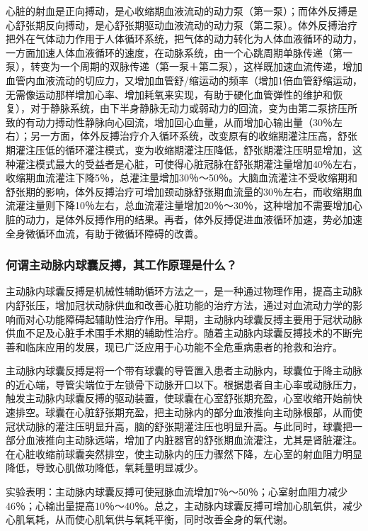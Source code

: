 心脏的射血是正向搏动，是心收缩期血液流动的动力泵（第一泵）；而体外反搏是心舒张期反向搏动，是心舒张期驱动血液流动的动力泵（第二泵）。体外反搏治疗把外在气体动力作用于人体循环系统，把气体的动力转化为人体血液循环的动力，一方面加速人体血液循环的速度，在动脉系统，由一个心跳周期单脉传递（第一泵），转变为一个周期的双脉传递（第一泵＋第二泵），这样既加速血流传递，增加血管内血液流动的切应力，又增加血管舒/缩运动的频率（增加1倍血管舒缩运动，无需像运动那样增加心率、增加耗氧来实现，有助于硬化血管弹性的维护和恢复），对于静脉系统，由下半身静脉无动力或弱动力的回流，变为由第二泵挤压所致的有动力搏动性静脉向心回流，增加回心血量，从而增加心输出量（30％左右）；另一方面，体外反搏治疗介入循环系统，改变原有的收缩期灌注压高，舒张期灌注压低的循环灌注模式，变为收缩期灌注压降低，舒张期灌注压明显增加，这种灌注模式最大的受益者是心脏，可使得心脏冠脉在舒张期灌注量增加40％左右，收缩期血流灌注下降5％，总灌注量增加30％～50％。大脑血流灌注不受收缩期和舒张期的影响，体外反搏治疗可增加颈动脉舒张期血流量的30％左右，而收缩期血流灌注量则下降10％左右，总血流灌注量增加20％～30％，这种增加不需要增加心脏的动力，是体外反搏作用的结果。再者，体外反搏促进血液循环加速，势必加速全身微循环血流，有助于微循环障碍的改善。

\subsubsection{何谓主动脉内球囊反搏，其工作原理是什么？}

主动脉内球囊反搏是机械性辅助循环方法之一，是一种通过物理作用，提高主动脉内舒张压，增加冠状动脉供血和改善心脏功能的治疗方法，通过对血流动力学的影响而对心功能障碍起辅助性治疗作用。早期，主动脉内球囊反搏主要用于冠状动脉供血不足及心脏手术围手术期的辅助性治疗。随着主动脉内球囊反搏技术的不断完善和临床应用的发展，现已广泛应用于心功能不全危重病患者的抢救和治疗。

主动脉内球囊反搏是将一个带有球囊的导管置入患者主动脉内，球囊位于降主动脉的近心端，导管尖端位于左锁骨下动脉开口以下。根据患者自主心率或动脉压力，触发主动脉内球囊反搏的驱动装置，使球囊在心室舒张期充盈，心室收缩开始前快速排空。球囊在心脏舒张期充盈，把主动脉内的部分血液推向主动脉根部，从而使冠状动脉的灌注压明显升高，脑的舒张期灌注压也明显升高。与此同时，球囊把一部分血液推向主动脉远端，增加了内脏器官的舒张期血流灌注，尤其是肾脏灌注。在心脏收缩前球囊突然排空，使主动脉内的压力骤然下降，左心室的射血阻力明显降低，导致心肌做功降低，氧耗量明显减少。

实验表明：主动脉内球囊反搏可使冠脉血流增加7％～50％；心室射血阻力减少46％；心输出量提高10％～40％。总之，主动脉内球囊反搏可增加心肌氧供，减少心肌氧耗，从而使心肌氧供与氧耗平衡，同时改善全身的氧代谢。

